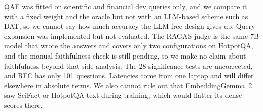 QAF was fitted on scientific and financial dev queries only, and we compare
it with a fixed weight and the oracle but not with an LLM-based scheme such as
DAT, so we cannot say how much accuracy the LLM-free design gives up. Query
expansion was implemented but not evaluated. The RAGAS judge is the same 7B
model that wrote the answers and covers only two configurations on
HotpotQA, and the manual faithfulness check is still pending, so we make no
claim about faithfulness beyond that side analysis. The 28 significance tests
are uncorrected, and RFC has only 101 questions. Latencies come from one
laptop and will differ elsewhere in absolute terms. We also cannot rule out
that EmbeddingGemma~2 saw SciFact or HotpotQA text during training, which would
flatter its dense scores there.
